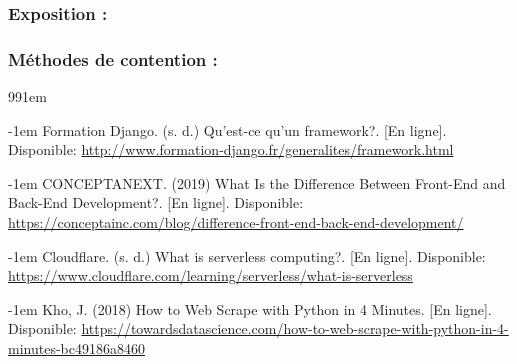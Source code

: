 \documentclass[12pt]{article}
\begin{document}
\subsubsection*{Exposition :}

\subsubsection*{Méthodes de contention :}

\newpage 

\def\bibindent{1em}
\begin{thebibliography}{99\kern\bibindent}
\makeatletter
\let\old@biblabel\@biblabel
\def\@biblabel#1{\old@biblabel{#1}\kern\bibindent}
\let\old@bibitem\bibitem
\def\bibitem#1{\old@bibitem{#1}\leavevmode\kern-\bibindent}
\makeatother

    
    Formation Django. (s. d.) Qu'est-ce qu'un framework?. [En ligne].
    Disponible: \url{http://www.formation-django.fr/generalites/framework.html}

    CONCEPTANEXT. (2019) What Is the Difference Between Front-End and Back-End Development?. [En ligne].
    Disponible: \url{https://conceptainc.com/blog/difference-front-end-back-end-development/}
    
    Cloudflare. (s. d.) What is serverless computing?. [En ligne]. Disponible:
    \url{https://www.cloudflare.com/learning/serverless/what-is-serverless}

    Kho, J. (2018) How to Web Scrape with Python in 4 Minutes. [En ligne]. Disponible:
    \url{https://towardsdatascience.com/how-to-web-scrape-with-python-in-4-minutes-bc49186a8460}

    

\end{thebibliography}
\end{document}
